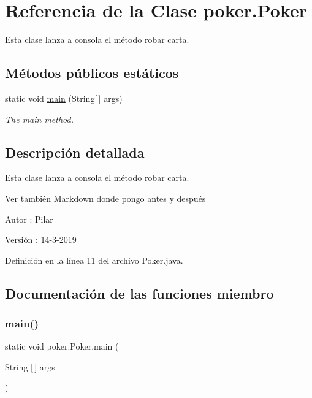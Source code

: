 \hypertarget{classpoker_1_1Poker}{}\section{Referencia de la Clase poker.\+Poker}
\label{classpoker_1_1Poker}


Esta clase lanza a consola el método robar carta.  


\subsection*{Métodos públicos estáticos}
\begin{DoxyCompactItemize}
\item 
static void \mbox{\hyperlink{classpoker_1_1Poker_ac07c479803c0f783042b79fb2999a9cb}{main}} (String\mbox{[}$\,$\mbox{]} args)
\begin{DoxyCompactList}\small\item\em The main method. \end{DoxyCompactList}\end{DoxyCompactItemize}


\subsection{Descripción detallada}
Esta clase lanza a consola el método robar carta. 

\begin{DoxySeeAlso}{Ver también}
Markdown donde pongo antes y después 
\end{DoxySeeAlso}
\begin{DoxyAuthor}{Autor}
\+: Pilar 
\end{DoxyAuthor}
\begin{DoxyVersion}{Versión}
\+: 14-\/3-\/2019 
\end{DoxyVersion}


Definición en la línea 11 del archivo Poker.\+java.



\subsection{Documentación de las funciones miembro}
\mbox{\label{classpoker_1_1Poker_ac07c479803c0f783042b79fb2999a9cb}} 
\subsubsection{\texorpdfstring{main()}{main()}}
{\footnotesize\ttfamily static void poker.\+Poker.\+main (\begin{DoxyParamCaption}\item[{String \mbox{[}$\,$\mbox{]}}]{args }\end{DoxyParamCaption})\hspace{0.3cm}{\ttfamily [static]}}



